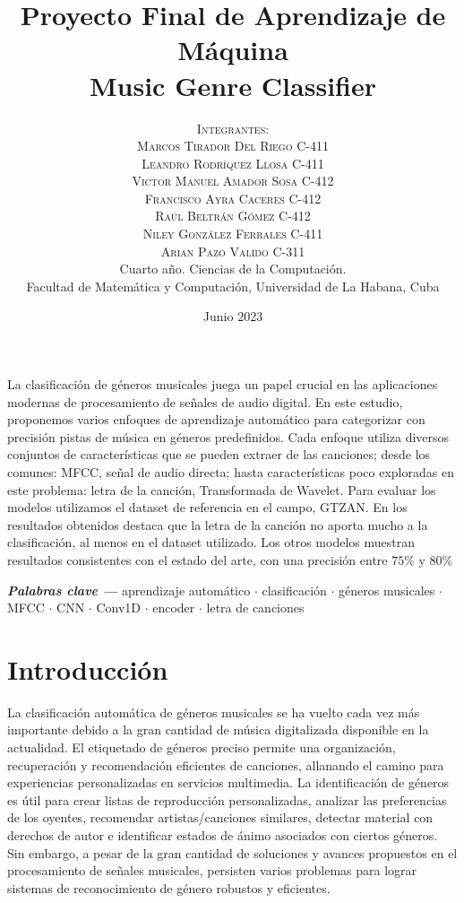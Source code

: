 \documentclass[colorinlistoftodos,twoside,twocolumn,10pt]{article} %
\title{\normalsize{Proyecto Final de Aprendizaje de M\'aquina}\\
	\Huge\bfseries Music Genre Classifier\\
} %
\author{%
	\normalsize\textsc{Integrantes:}\\
	\normalsize\textsc{Marcos Tirador Del Riego  C-411}\\
	\normalsize\textsc{Leandro Rodr\'iquez Llosa  C-411}\\
	\normalsize\textsc{Victor Manuel Amador Sosa C-412}\\
	\normalsize\textsc{Francisco Ayra Caceres C-412}\\
	\normalsize\textsc{Ra\'ul Beltr\'an G\'omez C-412}\\
	\normalsize\textsc{Niley Gonz\'alez Ferrales  C-411}\\
	\normalsize\textsc{Arian Pazo Valido  C-311} \\[2ex]
	\small Cuarto a\~no. Ciencias de la Computaci\'on. \\ %
	\small Facultad de Matem\'atica y Computaci\'on, Universidad de La Habana, Cuba \\ %
}
\date{\footnotesize Junio 2023 } %
\providecommand{\keywords}[1]
{
	\small	
	\vspace{0.5em}
	\noindent \textbf{\textit{Palabras clave --- }} #1
}
\renewenvironment{abstract}
{\small
	\begin{center}
		\bfseries \abstractname\vspace{-.5em}\vspace{0pt}
	\end{center}
	\list{}{
		\setlength{\leftmargin}{0.9cm}%
		\setlength{\rightmargin}{\leftmargin}%
	}%
	\item\relax}
{\endlist}
\begin{document}
	\maketitle

	\begin{abstract}

La clasificaci\'on de g\'eneros musicales juega un papel crucial en las aplicaciones modernas de procesamiento de se\~nales de audio digital. En este estudio, proponemos varios enfoques de aprendizaje autom\'atico para categorizar con precisi\'on pistas de m\'usica en g\'eneros predefinidos. Cada enfoque utiliza diversos conjuntos de caracter\'isticas que se pueden extraer de las canciones; desde los comunes: MFCC, se\~nal de audio directa; hasta caracter\'isticas poco exploradas en este problema: letra de la canci\'on, Transformada de Wavelet. Para evaluar los modelos utilizamos el dataset de referencia en el campo, GTZAN. En los resultados obtenidos destaca que la letra de la canci\'on no aporta mucho a la clasificaci\'on, al menos en el dataset utilizado. Los otros modelos muestran resultados consistentes con el estado del arte, con una precisi\'on entre $75\%$ y $80\%$

		\vspace{1em}
		\keywords{ 
			aprendizaje autom\'atico \textbf{$\cdot$} clasificaci\'on \textbf{$\cdot$}  g\'eneros musicales \textbf{$\cdot$} MFCC  \textbf{$\cdot$} CNN  \textbf{$\cdot$} Conv1D \textbf{$\cdot$} encoder  \textbf{$\cdot$} letra de canciones 
		}

	\end{abstract}
	
	
	\section{Introducci\'on}
	La clasificaci\'on autom\'atica de g\'eneros musicales se ha vuelto cada vez m\'as importante debido a la gran cantidad de m\'usica digitalizada disponible en la actualidad. El etiquetado de g\'eneros preciso permite una organizaci\'on, recuperaci\'on y recomendaci\'on eficientes de canciones, allanando el camino para experiencias personalizadas en servicios multimedia. La identificaci\'on de g\'eneros es \'util para crear listas de reproducci\'on personalizadas, analizar las preferencias de los oyentes, recomendar artistas/canciones similares, detectar material con derechos de autor e identificar estados de \'animo asociados con ciertos g\'eneros. Sin embargo, a pesar de la gran cantidad de soluciones y avances propuestos en el procesamiento de se\~nales musicales, persisten varios problemas para lograr sistemas de reconocimiento de g\'enero robustos y eficientes.
\end{document}
